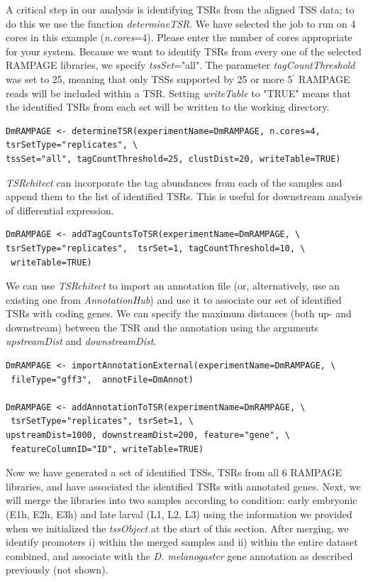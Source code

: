 \documentclass[runningheads,a4paper]{llncs}
\begin{document}
\begin{linenumbers}
A critical step in our analysis is identifying TSRs from the aligned TSS data; to do this we use the function \textit{determineTSR}. 
We have selected the job to run on 4 cores in this example (\textit{n.cores}=4). 
Please enter the number of cores appropriate for your system.
Because we want to identify TSRs from every one of the selected RAMPAGE libraries, we specify \textit{tssSet}="all".
The parameter \textit{tagCountThreshold} was set to 25, meaning that only TSSs supported by 25 or more 5$^\prime$ RAMPAGE reads will be included within a TSR.
Setting \textit{writeTable} to "TRUE" means that the identified TSRs from each set will be written to the working directory. 

\noindent
\begin{verbatim}
DmRAMPAGE <- determineTSR(experimentName=DmRAMPAGE, n.cores=4, tsrSetType="replicates", \
tssSet="all", tagCountThreshold=25, clustDist=20, writeTable=TRUE)
\end{verbatim}

\textit{TSRchitect} can incorporate the tag abundances from each of the samples and append them to the list of identified TSRs. 
This is useful for downstream analysis of differential expression.

\noindent
\begin{verbatim}
DmRAMPAGE <- addTagCountsToTSR(experimentName=DmRAMPAGE, \
tsrSetType="replicates",  tsrSet=1, tagCountThreshold=10, \
 writeTable=TRUE)
\end{verbatim}

We can use \textit{TSRchitect} to import an annotation file (or, alternatively, use an existing one from \textit{AnnotationHub}) and use it to associate our set of identified TSRs with coding genes. 
We can specify the maximum distances (both up- and downstream) between the TSR and the annotation using the arguments \textit{upstreamDist} and \textit{downstreamDist}.

\noindent
\begin{verbatim}
DmRAMPAGE <- importAnnotationExternal(experimentName=DmRAMPAGE, \
 fileType="gff3",  annotFile=DmAnnot)

DmRAMPAGE <- addAnnotationToTSR(experimentName=DmRAMPAGE, \
 tsrSetType="replicates", tsrSet=1, \
upstreamDist=1000, downstreamDist=200, feature="gene", \
 featureColumnID="ID", writeTable=TRUE)
\end{verbatim}

Now we have generated a set of identified TSSs, TSRs from all 6 RAMPAGE libraries, and have associated the identified TSRs with annotated genes. 
Next, we will merge the libraries into two samples according to condition: early embryonic (E1h, E2h, E3h) and late larval (L1, L2, L3) using the information we provided when we initialized the \textit{tssObject} at the start of this section.
After merging, we identify promoters i) within the merged samples and ii) within the entire dataset combined, and associate with the \textit{D. melanogaster} gene annotation as described previously (not shown).


\end{linenumbers}
\end{document}
